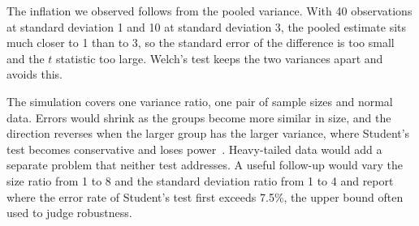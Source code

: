 The inflation we observed follows from the pooled variance. With 40 observations at standard deviation 1 and 10 at standard deviation 3, the pooled estimate sits much closer to 1 than to 3, so the standard error of the difference is too small and the $t$ statistic too large. Welch's test keeps the two variances apart and avoids this.

The simulation covers one variance ratio, one pair of sample sizes and normal data. Errors would shrink as the groups become more similar in size, and the direction reverses when the larger group has the larger variance, where Student's test becomes conservative and loses power~\citep{ruxton2006unequal}. Heavy-tailed data would add a separate problem that neither test addresses. A useful follow-up would vary the size ratio from 1 to 8 and the standard deviation ratio from 1 to 4 and report where the error rate of Student's test first exceeds 7.5\%, the upper bound often used to judge robustness.

